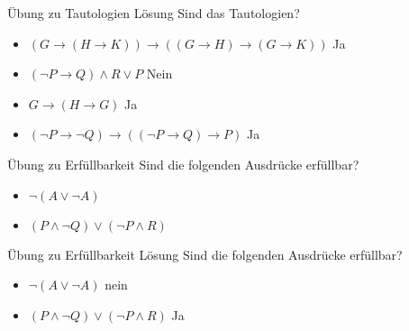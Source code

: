 \documentclass[]{beamer}
\begin{document}
\begin{frame} {Übung zu Tautologien Lösung}
Sind das Tautologien?
\begin{itemize}
	\item $(G \rightarrow (H \rightarrow K)) \rightarrow ((G \rightarrow H) \rightarrow (G \rightarrow K))$ \pause \hspace{0.3cm} Ja
	\item $(\lnot P \rightarrow Q) \land R \lor P$ \pause \hspace{0.3cm} Nein
	\item $G \rightarrow (H \rightarrow G)$ \pause \hspace{0.3cm} Ja
	\item $(\lnot P \rightarrow \lnot Q) \rightarrow ((\lnot P \rightarrow Q) \rightarrow P)$ \pause \hspace{0.3cm} Ja
\end{itemize}
\end{frame}


\begin{frame} {Übung zu Erfüllbarkeit}
	Sind die folgenden Ausdrücke erfüllbar?
	\begin{itemize}
		\item $ \lnot (A \lor \lnot A) $ \pause \hspace{0.3cm} 
		\item $(P \land \lnot Q) \lor (\lnot P \land R)$ \pause \hspace{0.3cm} 
		
	\end{itemize}
\end{frame}

\begin{frame} {Übung zu Erfüllbarkeit Lösung}
	Sind die folgenden Ausdrücke erfüllbar?
	\begin{itemize}
		\item $ \lnot (A \lor \lnot A) $ \pause \hspace{0.3cm} nein
		\item $(P \land \lnot Q) \lor (\lnot P \land R)$ \pause \hspace{0.3cm} Ja
		
	\end{itemize}
\end{frame}


\end{document}
